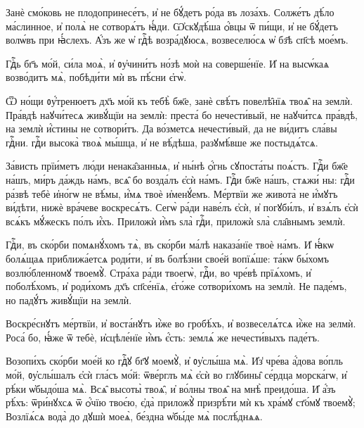 \hKv Занѐ смо́ковь не плодопринесе́тъ, и҆ не  бꙋ́детъ ро́да въ лоза́хъ. 
\hKv Солже́тъ дѣ́ло ма́слинное,  и҆ полѧ̀ не сотворѧ́тъ ꙗ҆́ди. 
\hKv Ѡ҆скꙋдѣ́ша ѻ҆́вцы ѿ  пи́щи, и҆ не бꙋ́детъ волѡ́въ при ꙗ҆́слехъ. 
\hKv А҆́зъ же  ѡ҆ гдⷭ҇ѣ возра́дꙋюсѧ, возвеселю́сѧ ѡ҆ бз҃ѣ сп҃сѣ мое́мъ.  
%

\hKv Гдⷭ҇ь бг҃ъ мо́й, си́ла моѧ̀, и҆ ᲂу҆чини́тъ  но́зѣ моѝ на соверше́нїе. 
\hKv И҆ на высѡ́каѧ  возво́дитъ мѧ̀, побѣди́ти мѝ въ пѣ́сни  є҆гѡ̀. 
%


\cuLettrine
Ѿ но́щи ᲂу҆́тренюетъ дх҃ъ мо́й къ тебѣ̀ бж҃е,  занѐ свѣ́тъ повелѣ̑нїѧ твоѧ̑ на землѝ. 
\hKv Пра́вдѣ  наꙋчи́тесѧ живꙋ́щїи на землѝ: преста́ бо нечести́вый, не  наꙋчи́тсѧ пра́вдѣ, на землѝ и҆́стины не сотвори́тъ. 
\hKv  Да во́зметсѧ нечести́вый, да не ви́дитъ сла́вы гдⷭ҇ни. гдⷭ҇и  высока̀ твоѧ̀ мы́шца, и҆ не вѣ́дѣша, разꙋмѣ́вше же  постыдѧ́тсѧ.  
%

\hKv За́висть прїи́метъ лю́ди ненака̑занныѧ, и҆  ны́нѣ ѻ҆́гнь сꙋпоста́ты поѧ́стъ. 
\hKv Гдⷭ҇и бж҃е на́шъ,  ми́ръ да́ждь на́мъ, всѧ̑ бо возда́лъ є҆сѝ на́мъ. 
\hKv  Гдⷭ҇и бж҃е на́шъ, стѧжи́ ны: гдⷭ҇и ра́звѣ тебѐ и҆но́гѡ не  вѣ́мы, и҆́мѧ твоѐ и҆менꙋ́емъ. 
\hKv Ме́ртвїи же живота̀ не  и҆́мꙋтъ ви́дѣти, нижѐ вра́чеве воскресѧ́тъ. 
\hKv Сегѡ̀  ра́ди  наве́лъ є҆сѝ, и҆  погꙋби́лъ, и҆ взѧ́лъ є҆сѝ всѧ́къ мꙋ́жескъ по́лъ и҆́хъ.  
\hKv Приложѝ и҆̀мъ ѕла̀ гдⷭ҇и, приложѝ ѕла̀ сла̑внымъ  землѝ. 
%

\hKv Гдⷭ҇и, въ ско́рби помѧнꙋ́хомъ тѧ̀, въ ско́рби  ма́лѣ наказа́нїе твоѐ на́мъ. 
\hKv И҆ ꙗ҆́кѡ болѧ́щаѧ  приближа́етсѧ роди́ти, и҆ въ болѣ́зни свое́й вопїѧ́ше:  та́кѡ бы́хомъ возлю́бленномꙋ твоемꙋ̀. 
\hKv Стра́ха ра́ди  твоегѡ̀, гдⷭ҇и, во чре́вѣ прїѧ́хомъ, и҆ поболѣ́хомъ, и҆  роди́хомъ дх҃ъ сп҃се́нїѧ, є҆го́же сотвори́хомъ на землѝ.  
\hKv Не паде́мъ, но падꙋ́тъ живꙋ́щїи на землѝ. 
%

\hKv Воскре́снꙋтъ ме́ртвїи, и҆ воста́нꙋтъ и҆̀же во  гробѣ́хъ, и҆ возвеселѧ́тсѧ и҆̀же на зелмѝ. 
\hKv Роса́  бо, ꙗ҆́же ѿ тебѐ, и҆сцѣле́нїе и҆̀мъ є҆́сть: землѧ́ же  нечести́выхъ паде́тъ.  
%


\cuLettrine
Возопи́хъ ско́рби мое́й ко гдⷭ҇ꙋ бг҃ꙋ моемꙋ̀, и҆  ᲂу҆слы́ша мѧ̀. 
\hKv И҆з̾ чре́ва а҆́дова  во́пль мо́й, ᲂу҆слы́шалъ є҆сѝ гла́съ мо́й:  ѿве́рглъ мѧ̀ є҆сѝ во глꙋбины̑ се́рдца морска́гѡ, и҆  рѣ́ки ѡ҆быдо́ша мѧ̀. 
\hKv Всѧ̑ высоты̀ твоѧ̑, и҆ во́лны  твоѧ̑ на мнѣ̀ преидо́ша. 
\hKv И҆ а҆́зъ рѣ́хъ: ѿри́нꙋхсѧ  ѿ ѻ҆́чїю твоє́ю, є҆да̀ приложꙋ̀ призрѣ́ти мѝ къ  хра́мꙋ ст҃о́мꙋ твоемꙋ̀; 
\hKv Возлїѧ́сѧ вода̀ до дꙋшѝ  моеѧ̀, бе́здна ѡ҆бы́де мѧ̀ послѣ́днѧѧ. 
%

